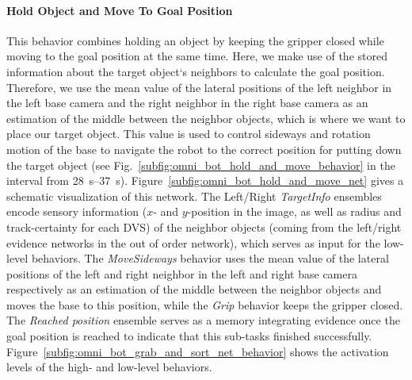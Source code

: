 \paragraph{Hold Object and Move To Goal Position} 
\label{holdmoveside}
This behavior combines holding an object by keeping the gripper closed while moving to the goal position at the same time. 
Here, we make use of the stored information about the target object`s neighbors to calculate the goal position. 
Therefore, we use the mean value of the lateral positions of the left neighbor in the left base camera and the right neighbor in the right base camera as an estimation of the middle between the neighbor objects, which is where we want to place our target object. 
This value is used to control sideways and rotation motion of the base to navigate the robot to the correct position for putting down the target object (see Fig.~\ref{subfig:omni_bot_hold_and_move_behavior} in the interval from \SIrange{28}{37}{\second}). 
Figure~\ref{subfig:omni_bot_hold_and_move_net} gives a schematic visualization of this network. 
The Left/Right \emph{TargetInfo} ensembles encode sensory information ($x$- and $y$-position in the image, as well as radius and track-certainty for each \ac{DVS}) of the neighbor objects (coming from the left/right evidence networks in the out of order network), which serves as input for the low-level behaviors.
The \emph{MoveSideways} behavior uses the mean value of the lateral positions of the left and right neighbor in the left and right base camera respectively as an estimation of the middle between the neighbor objects and moves the base to this position, while the \emph{Grip} behavior keeps the gripper closed.
The \emph{Reached position} ensemble serves as a memory integrating evidence once the goal position is reached to indicate that this sub-tasks finished successfully.
Figure~\ref{subfig:omni_bot_grab_and_sort_net_behavior} shows the activation levels of the high- and low-level behaviors.


